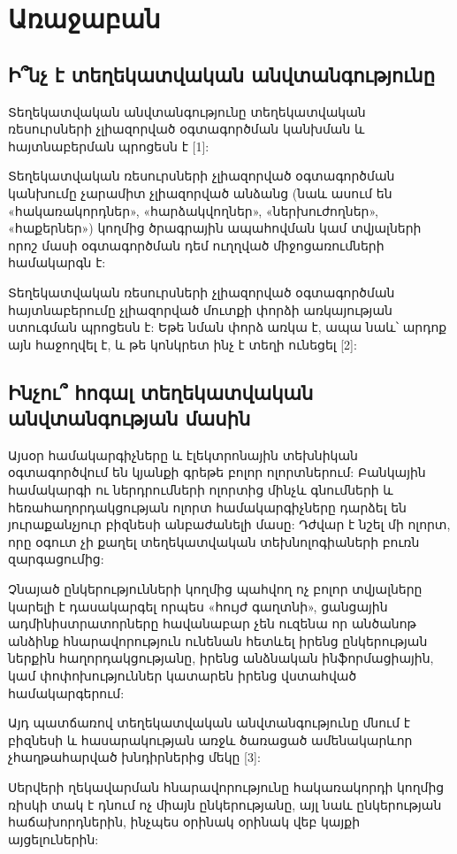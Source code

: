 \documentclass[a4paper,12pt]{article}
\begin{document}
\begin{sloppypar}
\section{Առաջաբան}


\subsection{Ի՞նչ է տեղեկատվական անվտանգությունը}

Տեղեկատվական անվտանգությունը տեղեկատվական ռեսուրսների չլիազորված օգտագործման
կանխման և հայտնաբերման պրոցեսն է [1]:

Տեղեկատվական ռեսուրսների չլիազորված օգտագործման
կանխումը չարամիտ չլիազորված անձանց (նաև ասում են «հակառակորդներ»,
«հարձակվողներ», «ներխուժողներ», «հաքերներ») կողմից ծրագրային ապահովման կամ
տվյալների որոշ մասի օգտագործման դեմ ուղղված միջոցառումների համակարգն է:

Տեղեկատվական ռեսուրսների չլիազորված օգտագործման
հայտնաբերումը չլիազորված մուտքի փորձի առկայության ստուգման պրոցեսն է: Եթե
նման փորձ առկա է, ապա նաև՝ արդոք այն հաջողվել է, և թե կոնկրետ ինչ է տեղի
ունեցել [2]:

\subsection{Ինչու՞ հոգալ տեղեկատվական անվտանգության մասին}

Այսօր համակարգիչները և էլեկտրոնային տեխնիկան օգտագործվում են
կյանքի գրեթե բոլոր ոլորտներում: Բանկային համակարգի ու ներդրումների ոլորտից
մինչև գնումների և հեռահաղորդակցության ոլորտ համակարգիչները դարձել են
յուրաքանչյուր բիզնեսի անբաժանելի մասը: Դժվար է նշել մի ոլորտ, որը
օգուտ չի քաղել տեղեկատվական տեխնոլոգիաների բուռն զարգացումից:

Չնայած ընկերությունների կողմից պահվող ոչ բոլոր տվյալները կարելի է
դասակարգել որպես «հույժ գաղտնի», ցանցային ադմինիստրատորները հավանաբար
չեն ուզենա որ անծանոթ անձինք հնարավորություն ունենան հետևել
իրենց ընկերության ներքին հաղորդակցությանը,
իրենց անձնական ինֆորմացիային, կամ փոփոխություններ կատարեն իրենց վստահված
համակարգերում:

Այդ պատճառով տեղեկատվական անվտանգությունը մնում է բիզնեսի և հասարակության
առջև ծառացած ամենակարևոր չհաղթահարված խնդիրներից մեկը [3]:

Սերվերի ղեկավարման հնարավորությունը հակառակորդի կողմից ռիսկի տակ է
դնում ոչ միայն ընկերությանը, այլ նաև ընկերության հաճախորդներին, ինչպես օրինակ
օրինակ վեբ կայքի այցելուներին:



\end{sloppypar}
\end{document}
